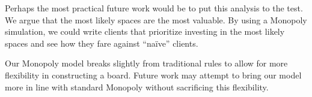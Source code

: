\documentclass[12pt]{article}
\theoremstyle{definition}
\begin{document}
Perhaps the most practical future work would be to put this analysis to the
test. We argue that the most likely spaces are the most valuable. By using a
Monopoly simulation, we could write clients that prioritize investing in the
most likely spaces and see how they fare against ``na\"{i}ve'' clients.

Our Monopoly model breaks slightly from traditional rules to allow for more
flexibility in constructing a board. Future work may attempt to bring our model
more in line with standard Monopoly without sacrificing this flexibility.

\pagebreak


\end{document}
